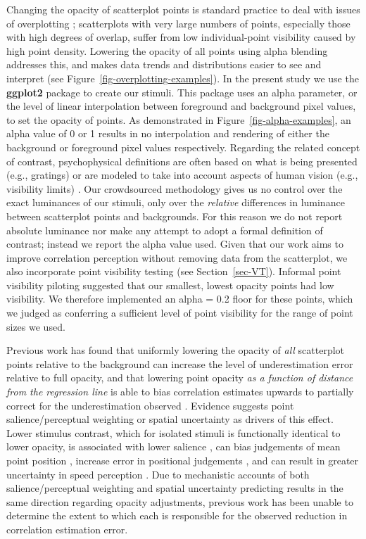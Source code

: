 \documentclass[sigconf]{acmart}
\begin{document}
Changing the opacity of scatterplot points is standard practice to deal
with issues of overplotting \citep{matejka_2015}; scatterplots with very
large numbers of points, especially those with high degrees of overlap,
suffer from low individual-point visibility caused by high point
density. Lowering the opacity of all points using alpha blending
\citep{few_2008} addresses this, and makes data trends and distributions
easier to see and interpret (see
Figure~\ref{fig-overplotting-examples}). In the present study we use the
\textbf{ggplot2} package \citep{hadley_gg2016} to create our stimuli.
This package uses an alpha parameter, or the level of linear
interpolation \citep{stone_2008} between foreground and background pixel
values, to set the opacity of points. As demonstrated in
Figure~\ref{fig-alpha-examples}, an alpha value of 0 or 1 results in no
interpolation and rendering of either the background or foreground pixel
values respectively. Regarding the related concept of contrast,
psychophysical definitions are often based on what is being presented
(e.g., gratings) or are modeled to take into account aspects of human
vision (e.g., visibility limits) \citep{zuffi_2007}. Our crowdsourced
methodology gives us no control over the exact luminances of our
stimuli, only over the \emph{relative} differences in luminance between
scatterplot points and backgrounds. For this reason we do not report
absolute luminance nor make any attempt to adopt a formal definition of
contrast; instead we report the alpha value used. Given that our work
aims to improve correlation perception without removing data from the
scatterplot, we also incorporate point visibility testing (see
Section~\ref{sec-VT}). Informal point visibility piloting suggested that
our smallest, lowest opacity points had low visibility. We therefore
implemented an alpha = 0.2 floor for these points, which we judged as
conferring a sufficient level of point visibility for the range of point
sizes we used.

Previous work has found that uniformly lowering the opacity of
\emph{all} scatterplot points relative to the background can increase
the level of underestimation error relative to full opacity, and that
lowering point opacity \emph{as a function of distance from the
regression line} is able to bias correlation estimates upwards to
partially correct for the underestimation observed \citep{strain_2023}.
Evidence suggests point salience/perceptual weighting or spatial
uncertainty as drivers of this effect. Lower stimulus contrast, which
for isolated stimuli is functionally identical to lower opacity, is
associated with lower salience \citep{healey_2011}, can bias judgements
of mean point position \citep{hong_2021}, increase error in positional
judgements \citep{wehrhahn_1990}, and can result in greater uncertainty
in speed perception \citep{champion_2017}. Due to mechanistic accounts
of both salience/perceptual weighting and spatial uncertainty predicting
results in the same direction regarding opacity adjustments, previous
work \citep{strain_2023} has been unable to determine the extent to
which each is responsible for the observed reduction in correlation
estimation error.
\end{document}
